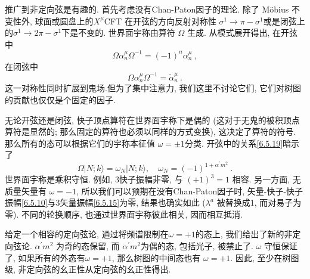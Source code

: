 推广到非定向弦是有趣的. 首先考虑没有Chan-Paton因子的理论. 除了 M\"{o}bius 不变性外, 球面或圆盘上的$X^{\mu}$CFT 在开弦的方向反射对称性 $\sigma^{1} \rightarrow \pi-\sigma^{1}$或是闭弦上的$\sigma^{1} \rightarrow 2 \pi-\sigma^{1}$下是不变的. 
世界面宇称由算符 $\Omega$ 生成. 从模式展开得出, 在开弦中
\begin{equation}
	\Omega \alpha_{n}^{\mu} \Omega^{-1}=(-1)^{n} \alpha_{n}^{\mu} \:, \label{6.5.19}
\end{equation}
在闭弦中
\begin{equation}
	\Omega \alpha_{n}^{\mu} \Omega^{-1}=\tilde{\alpha}_{n}^{\mu} \:. \label{6.5.20}
\end{equation}
这一对称性同时扩展到鬼场.但为了集中注意力, 我们这里不讨论它们, 它们对树图的贡献也仅仅是个固定的因子. 

无论开弦还是闭弦, 快子顶点算符在世界面宇称下是偶的 (这对于无鬼的被积顶点算符是显然的; 那么固定的算符也必须以同样的方式变换), 这决定了算符的符号. 
那么所有的态可以根据它们的宇称本征值 $\omega=\pm 1 $分类.  开弦中的关系\eqref{6.5.19}暗示了
\begin{equation}
	\Omega|N ; k\rangle=\omega_{N}|N ; k\rangle, \quad \omega_{N}=(-1)^{1+\alpha^{\prime} m^{2}} \:. \label{6.5.21}
\end{equation}
世界面宇称是乘积守恒. 例如, 3快子振幅非零, 与 $(+1)^{3}=1$ 相容.  另一方面, 无质量矢量有 $\omega=-1$, 所以我们可以预期在没有Chan-Paton因子时, 
矢量-快子-快子振幅\eqref{6.5.10}与3矢量振幅\eqref{6.5.15}为零, 结果也确实如此 ($\lambda^{a}$ 被替换成1, 而对易子为零). 
不同的轮换顺序, 也通过世界面宇称彼此相关, 因而相互抵消.

给定一个相容的定向弦论, 通过将频谱限制在$\omega=+1$的态上, 我们给出了新的非定向弦论.  $\alpha^{\prime} m^{2}$ 为奇的态保留, 
而 $\alpha^{\prime} m^{2}$为偶的态, 包括光子, 被禁止了. $\omega$ 守恒保证了, 如果所有的外态有$\omega=+1$, 那么树图的中间态也有 $\omega=+1$. 
因此, 至少在树图级, 非定向弦的幺正性从定向弦的幺正性得出. 

